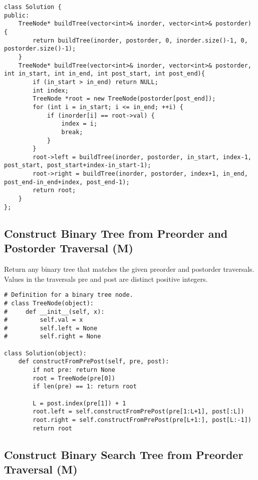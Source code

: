 \begin{lstlisting}
class Solution {
public:
    TreeNode* buildTree(vector<int>& inorder, vector<int>& postorder) {
        return buildTree(inorder, postorder, 0, inorder.size()-1, 0, postorder.size()-1);
    }
    TreeNode* buildTree(vector<int>& inorder, vector<int>& postorder, int in_start, int in_end, int post_start, int post_end){
        if (in_start > in_end) return NULL;
        int index;
        TreeNode *root = new TreeNode(postorder[post_end]);
        for (int i = in_start; i <= in_end; ++i) {
            if (inorder[i] == root->val) {
                index = i;
                break;
            }
        }
        root->left = buildTree(inorder, postorder, in_start, index-1, post_start, post_start+index-in_start-1);
        root->right = buildTree(inorder, postorder, index+1, in_end, post_end-in_end+index, post_end-1);
        return root;
    }
};
\end{lstlisting}

\subsection{Construct Binary Tree from Preorder and Postorder Traversal (M)}
Return any binary tree that matches the given preorder and postorder traversals.\\

Values in the traversals pre and post are distinct positive integers.\\

\begin{lstlisting}
# Definition for a binary tree node.
# class TreeNode(object):
#     def __init__(self, x):
#         self.val = x
#         self.left = None
#         self.right = None

class Solution(object):
    def constructFromPrePost(self, pre, post):
        if not pre: return None
        root = TreeNode(pre[0])
        if len(pre) == 1: return root

        L = post.index(pre[1]) + 1
        root.left = self.constructFromPrePost(pre[1:L+1], post[:L])
        root.right = self.constructFromPrePost(pre[L+1:], post[L:-1])
        return root
\end{lstlisting}

\subsection{Construct Binary Search Tree from Preorder Traversal (M)}

